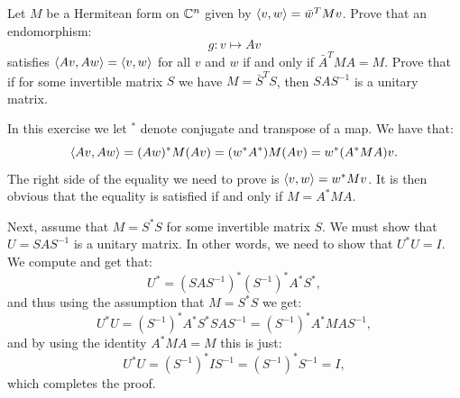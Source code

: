 \documentclass[11pt, a4paper]{article}
\begin{document}
\begin{exercise}
  Let $M$ be a Hermitean form on $\mathbb{C}^n$ given by $\left\langle v, w \right\rangle = \bar w^T M v$.
  Prove that an endomorphism:
  \[
    g \colon v \mapsto Av
  \]
  satisfies $\left\langle Av, Aw \right\rangle = \left\langle v, w \right\rangle$ for all $v$ and $w$ if and only if
  $\bar A^T M A = M$.
  Prove that if for some invertible matrix $S$ we have $M = \bar S^T S$,
  then $S A S^{-1}$ is a unitary matrix.
\end{exercise}
\begin{solution}
  In this exercise we let $^*$ denote conjugate and transpose of a map.
  We have that:
  \[
    \left\langle Av, Aw \right\rangle =
    (Aw)^* M (Av) =
    (w^* A^*) M (Av) =
    w^* (A^* M A) v.
  \]
  The right side of the equality we need to prove
  is $\left\langle v, w \right\rangle = w^* M v$.
  It is then obvious that the equality is satisfied if and only if $M = A^* M A$.

  Next, assume that $M = S^* S$ for some invertible matrix $S$.
  We must show that $U = S A S^{-1}$ is a unitary matrix.
  In other words, we need to show that $U^* U = I$.
  We compute and get that:
  \[
    U^* = (S A S^{-1})^*
    (S^{-1})^* A^* S^*,
  \]
  and thus using the assumption that $M = S^* S$ we get:
  \[
    U^* U =
    (S^{-1})^* A^* S^* S A S^{-1} =
    (S^{-1})^* A^* M A S^{-1},
  \]
  and by using the identity $A^* M A = M$ this is just:
  \[
    U^* U =
    (S^{-1})^* I S^{-1} =
    (S^{-1})^* S^{-1} = I,
  \]
  which completes the proof.
\end{solution}
\end{document}
